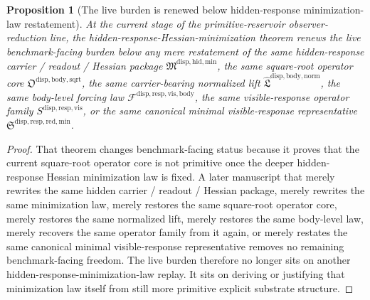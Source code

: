 \documentclass[11pt]{article}
\newcommand{\HiddenMinimizationPackage}{\mathfrak M^{\mathrm{disp,hid,min}}}
\newcommand{\SquareRootOperatorCore}{\mathfrak O^{\mathrm{disp,body,sqrt}}}
\newcommand{\NormalizedLiftPackage}{\widehat{\mathfrak L}^{\mathrm{disp,body,norm}}}
\newcommand{\VisibleBodyForcingLaw}{\mathscr F^{\mathrm{disp,resp,vis,body}}}
\newcommand{\VisibleResponseOperator}{S^{\mathrm{disp,resp,vis}}}
\newcommand{\MinimalReducedStructure}{\mathfrak S^{\mathrm{disp,resp,red,min}}}
\newtheorem{proposition}{Proposition}
\begin{document}
\begin{proposition}[The live burden is renewed below hidden-response minimization-law restatement]
At the current stage of the primitive-reservoir observer-reduction line, the hidden-response-Hessian-minimization theorem renews the live benchmark-facing burden below any mere restatement of the same hidden-response carrier / readout / Hessian package \(\HiddenMinimizationPackage\), the same square-root operator core \(\SquareRootOperatorCore\), the same carrier-bearing normalized lift \(\NormalizedLiftPackage\), the same body-level forcing law \(\VisibleBodyForcingLaw\), the same visible-response operator family \(\VisibleResponseOperator\), or the same canonical minimal visible-response representative \(\MinimalReducedStructure\).
\end{proposition}

\begin{proof}
That theorem changes benchmark-facing status because it proves that the current square-root operator core is not primitive once the deeper hidden-response Hessian minimization law is fixed. A later manuscript that merely rewrites the same hidden carrier / readout / Hessian package, merely rewrites the same minimization law, merely restores the same square-root operator core, merely restores the same normalized lift, merely restores the same body-level law, merely recovers the same operator family from it again, or merely restates the same canonical minimal visible-response representative removes no remaining benchmark-facing freedom. The live burden therefore no longer sits on another hidden-response-minimization-law replay. It sits on deriving or justifying that minimization law itself from still more primitive explicit substrate structure.
\end{proof}
\end{document}
